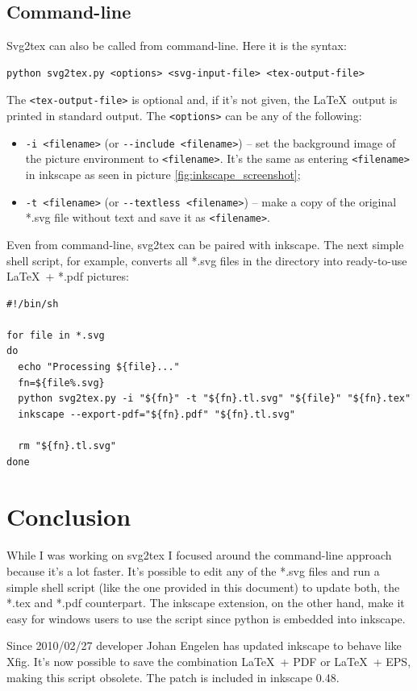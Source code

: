 \documentclass[a4paper,12pt]{article}
\begin{document}
\subsection{Command-line}

Svg2tex can also be called from command-line. Here it is the syntax:
\begin{verbatim}
python svg2tex.py <options> <svg-input-file> <tex-output-file>
\end{verbatim}
The \texttt{<tex-output-file>} is optional and, if it's not given, the \LaTeX\ output is printed in standard output. The \texttt{<options>} can be any of the following:
\begin{itemize}
  \item \texttt{-i <filename>} (or \texttt{-{}-include <filename>}) -- set the background image of the picture environment to \texttt{<filename>}. It's the same as entering \texttt{<filename>} in inkscape as seen in picture \ref{fig:inkscape_screenshot};
  \item \texttt{-t <filename>} (or \texttt{-{}-textless <filename>}) -- make a copy of the original *.svg file without text and save it as \texttt{<filename>}.
\end{itemize}
Even from command-line, svg2tex can be paired with inkscape. The next simple shell script, for example, converts all *.svg files in the directory into ready-to-use \LaTeX\ + *.pdf pictures:
{\small
\begin{verbatim}
#!/bin/sh

for file in *.svg
do
  echo "Processing ${file}..."
  fn=${file%.svg}
  python svg2tex.py -i "${fn}" -t "${fn}.tl.svg" "${file}" "${fn}.tex"
  inkscape --export-pdf="${fn}.pdf" "${fn}.tl.svg"

  rm "${fn}.tl.svg"
done
\end{verbatim}
}

\section{Conclusion}

While I was working on svg2tex I focused around the command-line approach because it's a lot faster. It's possible to edit any of the *.svg files and run a simple shell script (like the one provided in this document) to update both, the *.tex and *.pdf counterpart. The inkscape extension, on the other hand, make it easy for windows users to use the script since python is embedded into inkscape.

Since 2010/02/27 developer Johan Engelen has updated inkscape to behave like Xfig. It's now possible to save the combination \LaTeX\ + PDF or \LaTeX\ + EPS, making this script obsolete. The patch is included in inkscape 0.48.
\end{document}
